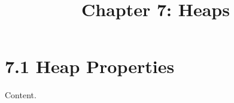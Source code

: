 \documentclass{article}
\title{Chapter 7: Heaps}
\begin{document}
\section{7.1 Heap Properties}
Content.
\end{document}
